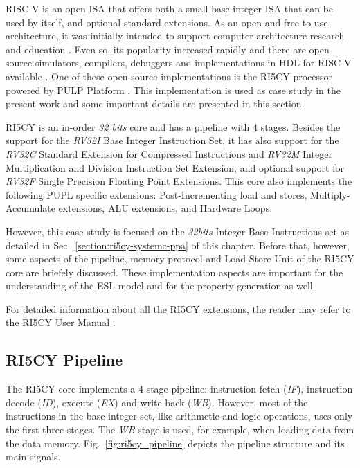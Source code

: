 RISC-V is an open ISA that offers both a small base integer ISA that can be used by itself, and optional standard extensions. As an open and free to use architecture, it was initially intended to support computer architecture research and education \cite{spec-riscv}. Even so, its popularity increased rapidly and there are open-source simulators, compilers, debuggers and implementations in HDL for RISC-V available \cite{book-comp-org}. One of these open-source implementations is the RI5CY processor powered by PULP Platform \cite{pulp}. This implementation is used as case study in the present work and some important details are presented in this section. 

RI5CY is an in-order \textit{32 bits} core and has a pipeline with 4 stages. Besides the support for the \textit{RV32I} Base Integer Instruction Set, it has also support for the \textit{RV32C} Standard Extension for Compressed Instructions and \textit{RV32M} Integer Multiplication and Division Instruction Set Extension, and optional support for \textit{RV32F} Single Precision Floating Point Extensions. This core also implements the following PUPL specific extensions:  Post-Incrementing load and stores, Multiply-Accumulate extensions, ALU extensions, and Hardware Loops.

However, this case study is focused on the \textit{32bits} Integer Base Instructions set  as detailed in Sec.~\ref{section:ri5cy-systemc-ppa} of this chapter. Before that, however, some aspects of the pipeline, memory protocol and Load-Store Unit of the RI5CY core are briefely discussed. These implementation aspects are important for the understanding of the ESL model and for the property generation as well.

For detailed information about all the RI5CY extensions, the reader may refer to the RI5CY User Manual \cite{manual-ri5cy}.

\subsection*{RI5CY Pipeline}

The RI5CY core implements a 4-stage pipeline: instruction fetch (\textit{IF}), instruction decode (\textit{ID}), execute (\textit{EX}) and write-back (\textit{WB}). However, most of the instructions in the base integer set, like arithmetic and logic operations, uses only the first three stages. The \textit{WB} stage is used, for example, when loading data from the data memory. Fig.~\ref{fig:ri5cy_pipeline} depicts the pipeline structure and its main signals.

